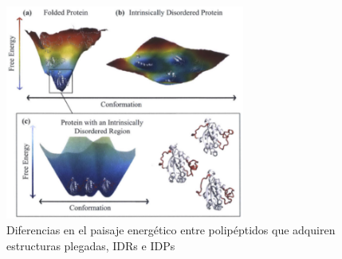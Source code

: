 \begin{figure}[h]
\centering
\includegraphics[width=0.7\textwidth]{img/idp-folded-EnLandscape.png} 
\caption{Diferencias en el paisaje energético entre polipéptidos que adquiren estructuras plegadas, IDRs e IDPs }
\label{idp-folded-EnergyLandscape}
\end{figure}


